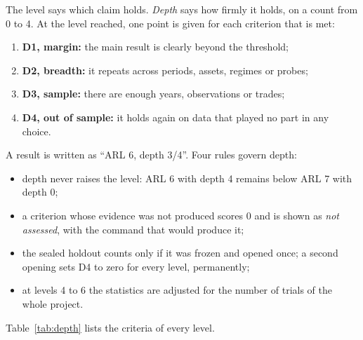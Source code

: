 \documentclass[11pt]{article}
\begin{document}
The level says which claim holds. \emph{Depth} says how firmly it holds, on a count from 0 to 4. At the level reached,
one point is given for each criterion that is met:
\begin{enumerate}
\item \textbf{D1, margin:} the main result is clearly beyond the threshold;
\item \textbf{D2, breadth:} it repeats across periods, assets, regimes or probes;
\item \textbf{D3, sample:} there are enough years, observations or trades;
\item \textbf{D4, out of sample:} it holds again on data that played no part in any choice.
\end{enumerate}

A result is written as ``ARL 6, depth 3/4''. Four rules govern depth:
\begin{itemize}
\item depth never raises the level: ARL 6 with depth 4 remains below ARL 7 with depth 0;
\item a criterion whose evidence was not produced scores 0 and is shown as \emph{not assessed}, with the command that
would produce it;
\item the sealed holdout counts only if it was frozen and opened once; a second opening sets D4 to zero for every level,
permanently;
\item at levels 4 to 6 the statistics are adjusted for the number of trials of the whole project.
\end{itemize}

Table~\ref{tab:depth} lists the criteria of every level.
\end{document}
